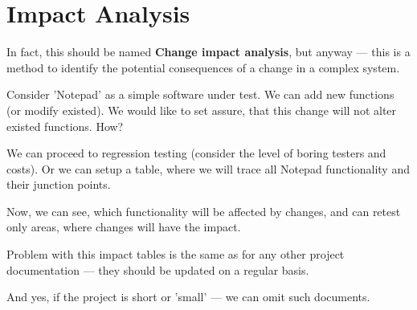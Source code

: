 \section{Impact Analysis}
\label{sec:Impact Analysis}

In fact, this should be named \textbf{Change impact analysis}, but anyway — this is a method to identify the potential consequences of a change in a complex system.

Consider 'Notepad' as a simple software under test. We can add new functions (or modify existed). We would like to set assure, that this change will not alter existed functions. How?

We can proceed to regression testing (consider the level of boring testers and costs). Or we can setup a table, where we will trace all Notepad functionality and their junction points.

Now, we can see, which functionality will be affected by changes, and can retest only areas, where changes will have the impact.

Problem with this impact tables is the same as for any other project documentation — they should be updated on a regular basis.

And yes, if the project is short or 'small' — we can omit such documents.
